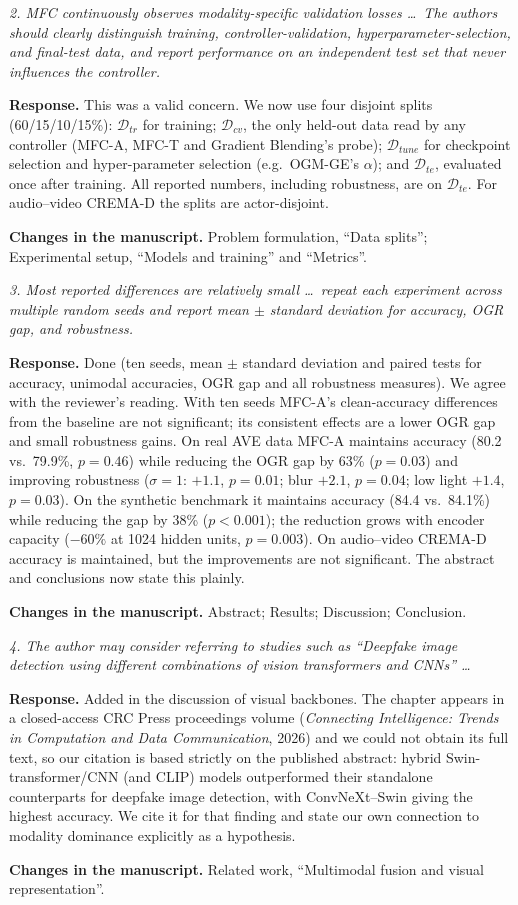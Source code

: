 \documentclass[11pt,a4paper]{article}
\newcommand{\rc}[1]{\par\noindent\colorbox{gray!12}{\parbox{\dimexpr\linewidth-2\fboxsep}{\small\textit{#1}}}\par}
\newcommand{\resp}{\par\noindent\textbf{Response.} }
\newcommand{\chg}{\par\noindent\textbf{Changes in the manuscript.} }
\begin{document}
\rc{2. MFC continuously observes modality-specific validation losses \ldots\ The authors should clearly distinguish training, controller-validation, hyperparameter-selection, and final-test data, and report performance on an independent test set that never influences the controller.}
\resp This was a valid concern. We now use four disjoint splits (60/15/10/15\%): $\mathcal{D}_{tr}$ for training; $\mathcal{D}_{cv}$, the only held-out data read by any controller (MFC-A, MFC-T and Gradient Blending's probe); $\mathcal{D}_{tune}$ for checkpoint selection and hyper-parameter selection (e.g.\ OGM-GE's $\alpha$); and $\mathcal{D}_{te}$, evaluated once after training. All reported numbers, including robustness, are on $\mathcal{D}_{te}$. For audio--video CREMA-D the splits are actor-disjoint.
\chg Problem formulation, ``Data splits''; Experimental setup, ``Models and training'' and ``Metrics''.

\rc{3. Most reported differences are relatively small \ldots\ repeat each experiment across multiple random seeds and report mean $\pm$ standard deviation for accuracy, OGR gap, and robustness.}
\resp Done (ten seeds, mean $\pm$ standard deviation and paired tests for accuracy, unimodal accuracies, OGR gap and all robustness measures). We agree with the reviewer's reading. With ten seeds MFC-A's clean-accuracy differences from the baseline are not significant; its consistent effects are a lower OGR gap and small robustness gains. On real AVE data MFC-A maintains accuracy (80.2 vs.\ 79.9\%, $p{=}0.46$) while reducing the OGR gap by 63\% ($p{=}0.03$) and improving robustness ($\sigma{=}1$: $+1.1$, $p{=}0.01$; blur $+2.1$, $p{=}0.04$; low light $+1.4$, $p{=}0.03$). On the synthetic benchmark it maintains accuracy (84.4 vs.\ 84.1\%) while reducing the gap by 38\% ($p<0.001$); the reduction grows with encoder capacity ($-60\%$ at 1024 hidden units, $p{=}0.003$). On audio--video CREMA-D accuracy is maintained, but the improvements are not significant. The abstract and conclusions now state this plainly.
\chg Abstract; Results; Discussion; Conclusion.

\rc{4. The author may consider referring to studies such as ``Deepfake image detection using different combinations of vision transformers and CNNs'' \ldots}
\resp Added in the discussion of visual backbones. The chapter appears in a closed-access CRC Press proceedings volume (\emph{Connecting Intelligence: Trends in Computation and Data Communication}, 2026) and we could not obtain its full text, so our citation is based strictly on the published abstract: hybrid Swin-transformer/CNN (and CLIP) models outperformed their standalone counterparts for deepfake image detection, with ConvNeXt--Swin giving the highest accuracy. We cite it for that finding and state our own connection to modality dominance explicitly as a hypothesis.
\chg Related work, ``Multimodal fusion and visual representation''.
\end{document}
